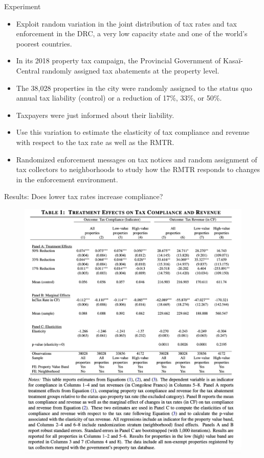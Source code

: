\documentclass{beamer}
\begin{document}
\begin{frame}{Experiment}
\begin{itemize}
    \item Exploit random variation in the joint distribution of tax
rates and tax enforcement in the DRC, a very low capacity state and one of the world’s
poorest countries.
    \item In its 2018 property tax
campaign, the Provincial Government of Kasaï-Central randomly assigned tax abatements
at the property level. 
\item The 38,028
properties in the city were randomly assigned to the status quo annual tax liability (control)
or a reduction of 17\%, 33\%, or 50\%.
\item Taxpayers were just informed about their liability. 
\item Use this variation to estimate the elasticity of tax compliance
and revenue with respect to the tax rate as well as the RMTR. 
\item Randomized enforcement messages on
tax notices and random assignment of tax collectors to neighborhoods to study how the
RMTR responds to changes in the enforcement environment.
\end{itemize}
\end{frame}

\begin{frame}{Results: Does lower tax rates increase compliance?}
\begin{figure}
    \centering
    \includegraphics[height=\textheight,width=\textwidth]{Paper Presentations/The State Capacity Ceiling on Tax Rates/T1.png}
    \label{fig:enter-label}
\end{figure}
\end{frame}
\end{document}
